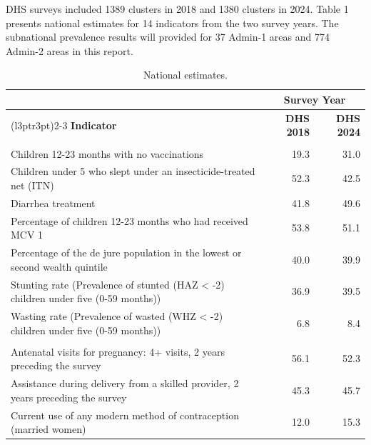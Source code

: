 \documentclass[
]{article}
\begin{document}
DHS surveys included 1389 clusters in 2018 and 1380 clusters in 2024. Table 1 presents national estimates for 14 indicators from the two survey years. The subnational prevalence results will provided for 37 Admin-1 areas and 774 Admin-2 areas in this report.

\begin{table}[!h]
\centering
\caption{\label{tab:unnamed-chunk-5}National estimates.}
\centering
\begin{tabular}[t]{lrr}
\toprule
\multicolumn{1}{c}{ } & \multicolumn{2}{c}{Survey Year} \\
\cmidrule(l{3pt}r{3pt}){2-3}
\textbf{Indicator} & \textbf{DHS 2018} & \textbf{DHS 2024}\\
\midrule
\addlinespace[0.3em]
\multicolumn{3}{l}{\textbf{Child Health}}\\
\hspace{1em}Children 12-23 months with no vaccinations & 19.3 & 31.0\\
\hspace{1em}Children under 5 who slept under an insecticide-treated net (ITN) & 52.3 & 42.5\\
\hspace{1em}Diarrhea treatment & 41.8 & 49.6\\
\hspace{1em}Percentage of children 12-23 months who had received MCV 1 & 53.8 & 51.1\\
\hspace{1em}Percentage of the de jure population in the lowest or second wealth quintile & 40.0 & 39.9\\
\hspace{1em}Stunting rate (Prevalence of stunted (HAZ < -2) children under five (0-59 months)) & 36.9 & 39.5\\
\hspace{1em}Wasting rate (Prevalence of wasted (WHZ < -2) children under five (0-59 months)) & 6.8 & 8.4\\
\addlinespace[0.3em]
\multicolumn{3}{l}{\textbf{Maternal Health}}\\
\hspace{1em}Antenatal visits for pregnancy: 4+ visits, 2 years preceding the survey & 56.1 & 52.3\\
\hspace{1em}Assistance during delivery from a skilled provider, 2 years preceding the survey & 45.3 & 45.7\\
\hspace{1em}Current use of any modern method of contraception (married women) & 12.0 & 15.3\\

\end{tabular}
\end{table}
\end{document}
